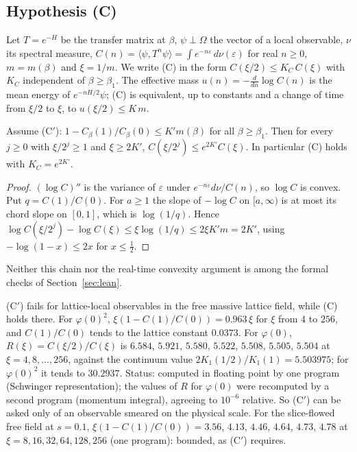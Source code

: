 \subsection{Hypothesis (C)}

Let $T=e^{-H}$ be the transfer matrix at $\beta$, $\psi\perp\Omega$ the vector of a local
observable, $\nu$ its spectral measure, $C(n)=\langle\psi,T^n\psi\rangle=\int e^{-n\varepsilon}\,d\nu(\varepsilon)$
for real $n\ge0$, $m=m(\beta)$ and $\xi=1/m$. We write (C) in the form
$C(\xi/2)\le K_C\,C(\xi)$ with $K_C$ independent of $\beta\ge\beta_1$. The effective mass
$u(n)=-\frac{d}{dn}\log C(n)$ is the mean energy of $e^{-nH/2}\psi$; (C) is equivalent, up to
constants and a change of time from $\xi/2$ to $\xi$, to $u(\xi/2)\le K\,m$.

\begin{proposition}\label{neg:prop-Cprime}
Assume \textup{(C$'$)}: $1-C_\beta(1)/C_\beta(0)\le K'm(\beta)$ for all $\beta\ge\beta_1$. Then for
every $j\ge0$ with $\xi/2^j\ge1$ and $\xi\ge2K'$,
$C(\xi/2^j)\le e^{2K'}C(\xi)$. In particular (C) holds with $K_C=e^{2K'}$.
\end{proposition}

\begin{proof}
$(\log C)''$ is the variance of $\varepsilon$ under $e^{-n\varepsilon}d\nu/C(n)$, so $\log C$ is
convex. Put $q=C(1)/C(0)$. For $a\ge1$ the slope of $-\log C$ on $[a,\infty)$ is at most its
chord slope on $[0,1]$, which is $\log(1/q)$. Hence
$\log C(\xi/2^j)-\log C(\xi)\le\xi\log(1/q)\le2\xi K'm=2K'$, using $-\log(1-x)\le2x$ for
$x\le\frac12$.
\end{proof}

Neither this chain nor the real-time convexity argument is among the formal checks of Section~\ref{sec:lean}.

\begin{observation}\label{neg:obs-Cprime-free}
(C$'$) fails for lattice-local observables in the free massive lattice field, while (C) holds
there. For $\varphi(0)^2$, $\xi(1-C(1)/C(0))=0.963\,\xi$ for $\xi$ from $4$ to $256$, and $C(1)/C(0)$
tends to the lattice constant $0.0373$. For $\varphi(0)$, $R(\xi)=C(\xi/2)/C(\xi)$ is $6.584$,
$5.921$, $5.580$, $5.522$, $5.508$, $5.505$, $5.504$ at $\xi=4,8,\dots,256$, against the continuum
value $2K_1(1/2)/K_1(1)=5.503975$; for $\varphi(0)^2$ it tends to $30.2937$. Status: computed in
floating point by one program (Schwinger representation); the values of $R$ for $\varphi(0)$ were
recomputed by a second program (momentum integral), agreeing to $10^{-6}$ relative. So (C$'$)
can be asked only of an observable smeared on the physical scale. For the slice-flowed free
field at $s=0.1$, $\xi(1-C(1)/C(0))=3.56$, $4.13$, $4.46$, $4.64$, $4.73$, $4.78$ at
$\xi=8,16,32,64,128,256$ (one program): bounded, as (C$'$) requires.
\end{observation}

